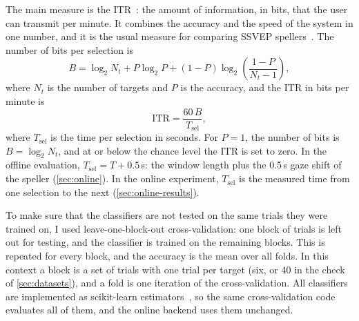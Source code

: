 The main measure is the \ac{ITR}~\citep{wolpaw2002bci}: the amount of information, in bits,
that the user can transmit per minute. It combines the accuracy and the speed of the system in
one number, and it is the usual measure for comparing \ac{SSVEP}
spellers~\citep{chen2015highspeed,nakanishi2018trca}. The number of bits per selection is
\begin{equation}
    B = \log_2 N_t + P \log_2 P + (1 - P) \log_2\left(\frac{1 - P}{N_t - 1}\right),
    \label{eq:bits}
\end{equation}
where $N_t$ is the number of targets and $P$ is the accuracy, and the \ac{ITR} in bits per
minute is
\begin{equation}
    \mathrm{ITR} = \frac{60\,B}{T_\mathrm{sel}},
    \label{eq:itr}
\end{equation}
where $T_\mathrm{sel}$ is the time per selection in seconds. For $P = 1$, the number of bits is
$B = \log_2 N_t$, and at or below the chance level the \ac{ITR} is set to zero. In the offline
evaluation, $T_\mathrm{sel} = T + 0.5$\,s: the window length plus the 0.5\,s gaze shift of the
speller (\cref{sec:online}). In the online experiment, $T_\mathrm{sel}$ is the measured time
from one selection to the next (\cref{sec:online-results}).

To make sure that the classifiers are not tested on the same trials they were trained on, I
used leave-one-block-out cross-validation: one block of trials is left out for testing,
and the classifier is trained on the remaining blocks. This is repeated for every block,
and the accuracy is the mean over all folds. In this context a block is a set of trials with
one trial per target (six, or 40 in the check of \cref{sec:datasets}), and a fold is one
iteration of the cross-validation. All classifiers are implemented as scikit-learn
estimators~\citep{pedregosa2011sklearn}, so the same cross-validation code evaluates all of
them, and the online backend uses them unchanged.

